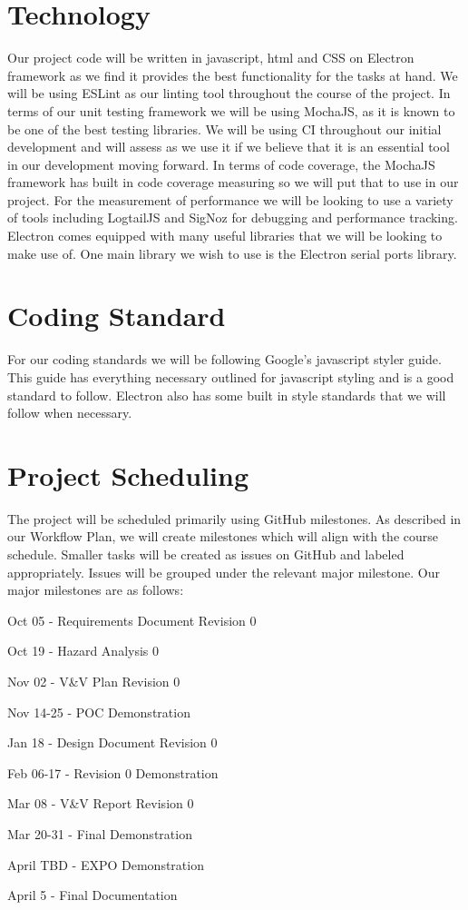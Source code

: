 \documentclass{article}
\begin{document}
\section{Technology}


Our project code will be written in javascript, html and CSS on Electron framework as 
we find it provides the best functionality for the tasks at hand. We will be using ESLint 
as our linting tool throughout the course of the project. In terms of our unit testing 
framework we will be using MochaJS, as it is known to be one of the best testing libraries. 
We will be using CI throughout our initial development and will assess as we use it if we believe
that it is an essential tool in our development moving forward. In terms of code coverage, the MochaJS 
framework has built in code coverage measuring so we will put that to use in our project. For the
measurement of performance we will be looking to use a variety of tools including LogtailJS and SigNoz 
for debugging and performance tracking. Electron comes equipped with many useful libraries that we 
will be looking to make use of. One main library we wish to use is the Electron serial ports library.
  
\section{Coding Standard}
  
For our coding standards we will be following Google's javascript styler guide. This guide has everything
necessary outlined for javascript styling and is a good standard to follow. Electron also has some built in 
style standards that we will follow when necessary.

\section{Project Scheduling}

\noindent The project will be scheduled primarily using GitHub milestones. As described in our Workflow Plan, we will create milestones which will align with the course schedule. Smaller tasks will be created as issues on GitHub and labeled appropriately. Issues will be grouped under the relevant major milestone. Our major milestones are as follows:

\item Oct 05 - Requirements Document Revision 0
\item Oct 19 - Hazard Analysis 0 
\item Nov 02 - V&V Plan Revision 0
\item Nov 14-25 - POC Demonstration
\item Jan 18 - Design Document Revision 0
\item Feb 06-17 - Revision 0 Demonstration
\item Mar 08 - V&V Report Revision 0
\item Mar 20-31 - Final Demonstration
\item April TBD - EXPO Demonstration
\item April 5 - Final Documentation \\
\end{document}
